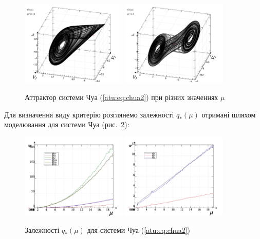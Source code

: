 \documentclass[a4paper,13pt]{atuaref}
\begin{document}
\begin{figure}[htb!]
\centerline{
  \includegraphics[width=0.45\textwidth]{p5/p/cha/chua/chua_1-p_xyz_mu=2x74.png}
  \includegraphics[width=0.45\textwidth]{p5/p/cha/chua/chua_1-p_xyz_mu=4x50.png}
}
\caption{Аттрактор системи Чуа (\ref{atu:eq:chua2}) при різних значеннях $\mu$}
\label{atu:f:chua_phase}
\end{figure}

Для визначення виду критерію розглянемо залежності $ q_{*}(\mu)$ отримані
шляхом моделювання для системи Чуа (рис.~\ref{atu:f:chua_q}):

\begin{figure}[htb!]
\centerline{
  \includegraphics[width=0.45\textwidth]{p5/p/cha/chua/chua_q-p_mu2.png}
  \includegraphics[width=0.45\textwidth]{p5/p/cha/chua/chua_q-p_mu1.png}
}
  \caption{Залежності $q_{*}(\mu) $ для системи Чуа (\ref{atu:eq:chua2})}
\label{atu:f:chua_q}
\end{figure}
\end{document}
